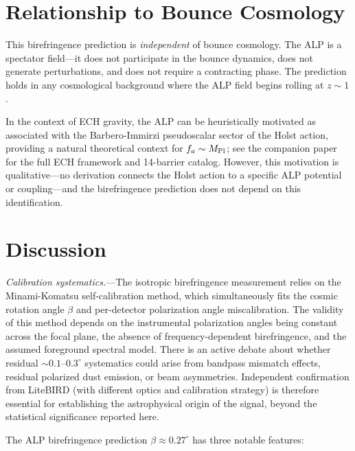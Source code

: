 \documentclass[a4paper,11pt]{article}
\begin{document}
\section{Relationship to Bounce Cosmology}

This birefringence prediction is \emph{independent} of bounce cosmology. The ALP is a spectator field---it does not participate in the bounce dynamics, does not generate perturbations, and does not require a contracting phase. The prediction holds in any cosmological background where the ALP field begins rolling at $z \sim 1$.

In the context of ECH gravity, the ALP can be heuristically motivated as associated with the Barbero-Immirzi pseudoscalar sector of the Holst action, providing a natural theoretical context for $f_a \sim M_{\rm Pl}$; see the companion paper~\citep{Golden2026P1a} for the full ECH framework and 14-barrier catalog. However, this motivation is qualitative---no derivation connects the Holst action to a specific ALP potential or coupling---and the birefringence prediction does not depend on this identification.

\section{Discussion}\label{sec:discussion}

\textit{Calibration systematics.}---The isotropic birefringence measurement relies on the Minami-Komatsu self-calibration method, which simultaneously fits the cosmic rotation angle $\beta$ and per-detector polarization angle miscalibration. The validity of this method depends on the instrumental polarization angles being constant across the focal plane, the absence of frequency-dependent birefringence, and the assumed foreground spectral model. There is an active debate about whether residual $\sim 0.1$--$0.3^\circ$ systematics could arise from bandpass mismatch effects, residual polarized dust emission, or beam asymmetries. Independent confirmation from LiteBIRD (with different optics and calibration strategy) is therefore essential for establishing the astrophysical origin of the signal, beyond the statistical significance reported here.

The ALP birefringence prediction $\beta \approx 0.27^\circ$ has three notable features:
\end{document}
